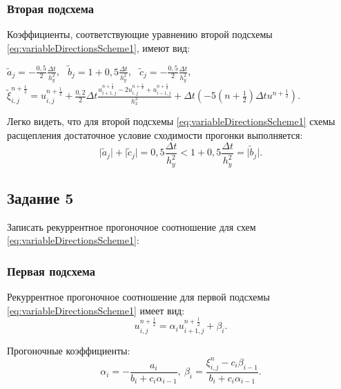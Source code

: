 \documentclass[12pt, a4paper]{report}
\begin{document}
	\subsubsection*{Вторая подсхема}
	\large
	Коэффициенты, соответствующие уравнению второй подсхемы \eqref{eq:variableDirectionsScheme1}, имеют вид:
	\small
	\begin{center}
		$\tilde{a}_{j}=-\frac{0,5}{2}\frac{\Delta t}{h_{y}^{2}}$, $\>$ $\tilde{b}_{j}=1 + 0,5\frac{\Delta t}{h_{y}^{2}}$, $\>$ $\tilde{c}_{j}=-\frac{0,5}{2}\frac{\Delta t}{h_{y}^{2}}$, $\>$ $\tilde{\xi}_{i, j}^{n+\frac{1}{2}}=u_{i, j}^{n+\frac{1}{2}} + \frac{0,2}{2}\Delta t\frac{u_{i+1, j}^{n+\frac{1}{2}} - 2u_{i, j}^{n+\frac{1}{2}} + u_{i-1, j}^{n+\frac{1}{2}}}{h_{x}^{2}} + \Delta t(-5(n+\frac{1}{2})\Delta t u^{n+\frac{1}{2}})$.
	\end{center}
	\par
	\large
	Легко видеть, что для второй подсхемы \eqref{eq:variableDirectionsScheme1} схемы расщепления достаточное условие сходимости прогонки выполняется:
	\begin{equation*}
		\lvert \tilde{a}_{j} \rvert + \lvert \tilde{c}_{j} \rvert = 0,5\frac{\Delta t}{h_{y}^{2}} < 1 + 0,5\frac{\Delta t}{h_{y}^{2}} = \lvert \tilde{b}_{j} \rvert.
	\end{equation*}
	
	\subsection*{Задание 5}
	\large
	Записать рекуррентное прогоночное соотношение для схем \eqref{eq:variableDirectionsScheme1}:
	\subsubsection*{Первая подсхема}
	\large
	Рекуррентное прогоночное соотношение для первой подсхемы \eqref{eq:variableDirectionsScheme1} имеет вид:
	\begin{equation*}
		u_{i, j}^{n+\frac{1}{2}} = \alpha_{i}u_{i+1, j}^{n+\frac{1}{2}} + \beta_{i}.
	\end{equation*}
	\par
	Прогоночные коэффициенты:
	\begin{equation*}
		\alpha_{i} = -\frac{a_{i}}{b_{i} + c_{i}\alpha_{i-1}}, \> \beta_{i} = \frac{\xi_{i, j}^{n} - c_{i}\beta_{i-1}}{b_{i} + c_{i}\alpha_{i-1}}.
	\end{equation*}
\end{document}
